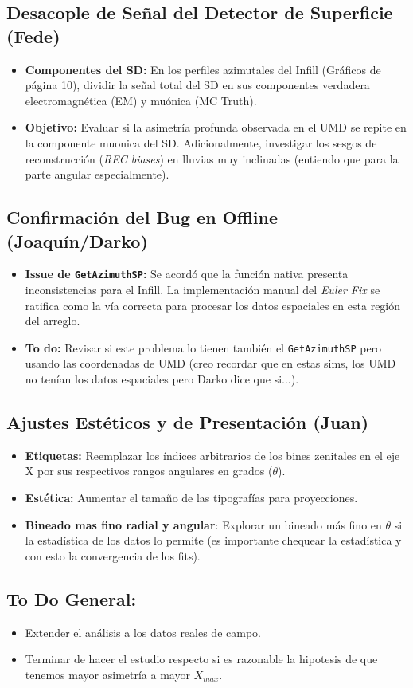 \subsection{Desacople de Señal del Detector de Superficie (Fede)}
\begin{itemize}
	\item \textbf{Componentes del SD:} En los perfiles azimutales del Infill (Gráficos de página 10), dividir la señal total del SD en sus componentes verdadera electromagnética (EM) y muónica (MC Truth).
	\item \textbf{Objetivo:} Evaluar si la asimetría profunda observada en el UMD se repite en la componente muonica del SD. Adicionalmente, investigar los sesgos de reconstrucción (\textit{REC biases}) en lluvias muy inclinadas (entiendo que para la parte angular especialmente).
\end{itemize}

\subsection{Confirmación del Bug en Offline (Joaquín/Darko)}
\begin{itemize}
	\item \textbf{Issue de \texttt{GetAzimuthSP}:} Se acordó que la función nativa presenta inconsistencias para el Infill. La implementación manual del \textit{Euler Fix} se ratifica como la vía correcta para procesar los datos espaciales en esta región del arreglo.
	\item \textbf{To do:} Revisar si este problema lo tienen también el \texttt{GetAzimuthSP} pero usando las coordenadas de UMD (creo recordar que en estas sims, los UMD no tenían los datos espaciales pero Darko dice que si...).
\end{itemize}

\subsection{Ajustes Estéticos y de Presentación (Juan)}
\begin{itemize}
	\item \textbf{Etiquetas:} Reemplazar los índices arbitrarios de los bines zenitales en el eje X por sus respectivos rangos angulares en grados ($\theta$).
	\item \textbf{Estética:} Aumentar el tamaño de las tipografías para proyecciones.
	\item \textbf{Bineado mas fino radial y angular}:  Explorar un bineado más fino en $\theta$ si la estadística de los datos lo permite (es importante chequear la estadística y con esto la convergencia de los fits).
\end{itemize}

\subsection{To Do General:}
\begin{itemize}
	\item Extender el análisis a los datos reales de campo.
	\item Terminar de hacer el estudio respecto si es razonable la hipotesis de que tenemos mayor asimetría a mayor $X_{max}$.
\end{itemize}
